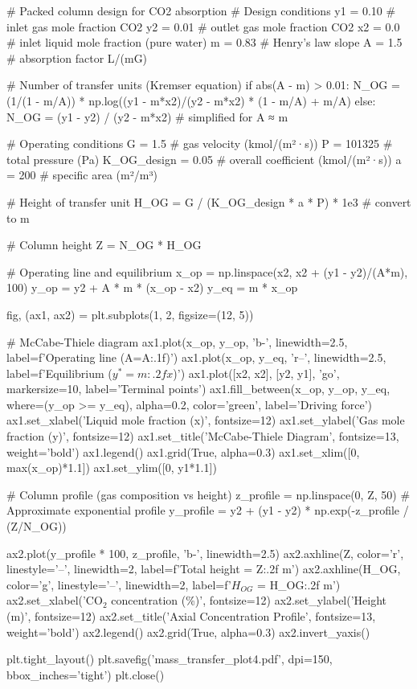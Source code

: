 \documentclass[11pt,a4paper]{article}
\begin{document}
\begin{pycode}
# Packed column design for CO2 absorption
# Design conditions
y1 = 0.10  # inlet gas mole fraction CO2
y2 = 0.01  # outlet gas mole fraction CO2
x2 = 0.0   # inlet liquid mole fraction (pure water)
m = 0.83   # Henry's law slope
A = 1.5    # absorption factor L/(mG)

# Number of transfer units (Kremser equation)
if abs(A - m) > 0.01:
    N_OG = (1/(1 - m/A)) * np.log((y1 - m*x2)/(y2 - m*x2) * (1 - m/A) + m/A)
else:
    N_OG = (y1 - y2) / (y2 - m*x2)  # simplified for A ≈ m

# Operating conditions
G = 1.5  # gas velocity (kmol/(m²·s))
P = 101325  # total pressure (Pa)
K_OG_design = 0.05  # overall coefficient (kmol/(m²·s))
a = 200  # specific area (m²/m³)

# Height of transfer unit
H_OG = G / (K_OG_design * a * P) * 1e3  # convert to m

# Column height
Z = N_OG * H_OG

# Operating line and equilibrium
x_op = np.linspace(x2, x2 + (y1 - y2)/(A*m), 100)
y_op = y2 + A * m * (x_op - x2)
y_eq = m * x_op

fig, (ax1, ax2) = plt.subplots(1, 2, figsize=(12, 5))

# McCabe-Thiele diagram
ax1.plot(x_op, y_op, 'b-', linewidth=2.5, label=f'Operating line (A={A:.1f})')
ax1.plot(x_op, y_eq, 'r--', linewidth=2.5, label=f'Equilibrium ($y^* = {m:.2f}x$)')
ax1.plot([x2, x2], [y2, y1], 'go', markersize=10, label='Terminal points')
ax1.fill_between(x_op, y_op, y_eq, where=(y_op >= y_eq), alpha=0.2, color='green', label='Driving force')
ax1.set_xlabel('Liquid mole fraction (x)', fontsize=12)
ax1.set_ylabel('Gas mole fraction (y)', fontsize=12)
ax1.set_title('McCabe-Thiele Diagram', fontsize=13, weight='bold')
ax1.legend()
ax1.grid(True, alpha=0.3)
ax1.set_xlim([0, max(x_op)*1.1])
ax1.set_ylim([0, y1*1.1])

# Column profile (gas composition vs height)
z_profile = np.linspace(0, Z, 50)
# Approximate exponential profile
y_profile = y2 + (y1 - y2) * np.exp(-z_profile / (Z/N_OG))

ax2.plot(y_profile * 100, z_profile, 'b-', linewidth=2.5)
ax2.axhline(Z, color='r', linestyle='--', linewidth=2, label=f'Total height = {Z:.2f} m')
ax2.axhline(H_OG, color='g', linestyle='--', linewidth=2, label=f'$H_{{OG}}$ = {H_OG:.2f} m')
ax2.set_xlabel('CO$_2$ concentration (\%)', fontsize=12)
ax2.set_ylabel('Height (m)', fontsize=12)
ax2.set_title('Axial Concentration Profile', fontsize=13, weight='bold')
ax2.legend()
ax2.grid(True, alpha=0.3)
ax2.invert_yaxis()

plt.tight_layout()
plt.savefig('mass_transfer_plot4.pdf', dpi=150, bbox_inches='tight')
plt.close()
\end{pycode}
\end{document}
